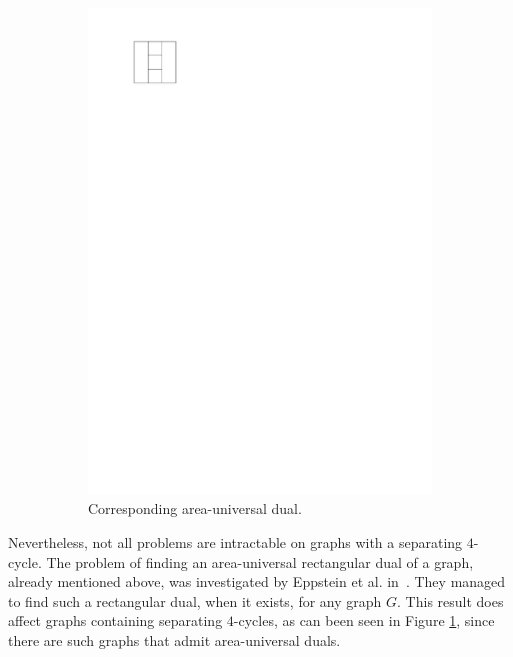 \begin{figure}
\begin{subfigure}[t]{3cm}
        \includegraphics[scale=1]{introduction/img/areaunivDual.pdf}
        \caption{Corresponding area-universal dual.}
      \end{subfigure}
    \caption{}
    \label{fig:intro:areauniv}
  \end{figure}

  Nevertheless, not all problems are intractable on graphs with a separating $4$-cycle. The problem of finding an area-universal rectangular dual of a graph, already mentioned above, was investigated by Eppstein et al. in~\cite{Eppstein2012}. They managed to find such a rectangular dual, when it exists, for any graph $G$. This result does affect graphs containing separating $4$-cycles, as can been seen in Figure \ref{fig:intro:areauniv}, since there are such graphs that admit area-universal duals.



